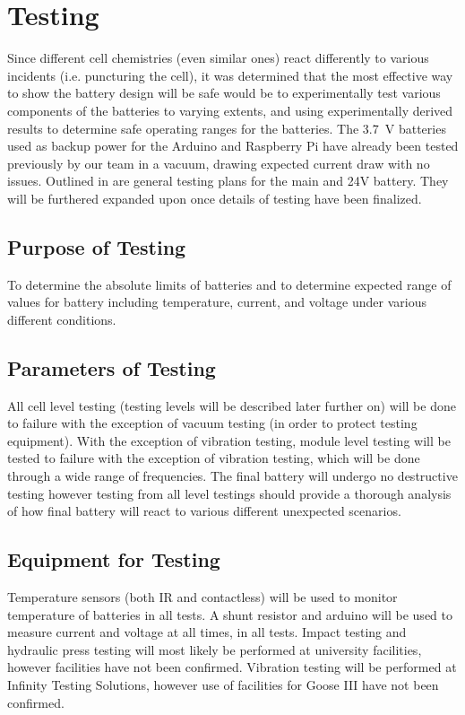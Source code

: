 \documentclass[main.tex]{subfiles}
\begin{document}
    \section{Testing}
    Since different cell chemistries (even similar ones) react differently to various incidents (i.e. puncturing the cell), it was determined that the most effective way to show the battery design will be safe would be to experimentally test various components of the batteries to varying  extents, and using experimentally derived results to determine safe operating ranges for the batteries. The \SI{3.7}{V} batteries used as backup power for the Arduino and Raspberry Pi have already been tested previously by our team in a vacuum, drawing expected current draw with no issues. Outlined in  are general testing plans for the main and 24V battery. They will be furthered expanded upon once details of testing have been finalized.
    \subsection{Purpose of Testing}
    To determine the absolute limits of batteries and to determine expected range of values for battery including temperature, current, and voltage under various different conditions.
    \subsection{Parameters of Testing}
    All cell level testing (testing levels will be described later further on) will be done to failure with the exception of vacuum testing (in order to protect testing equipment). With the exception of vibration testing, module level testing will be tested to failure with the exception of vibration testing, which will be done through a wide range of frequencies. The final battery will undergo no destructive testing however testing from all level testings should provide a thorough analysis of how final battery will react to various different unexpected scenarios.
    \subsection{Equipment for Testing}
    Temperature sensors (both IR and contactless) will be used to monitor temperature of batteries in all tests. A shunt resistor and arduino will be used to measure current and voltage at all times, in all tests. Impact testing and hydraulic press testing will most likely be performed at university facilities, however facilities have not been confirmed. Vibration testing will be performed at Infinity Testing Solutions, however use of facilities for Goose III have not been confirmed.
\end{document}
